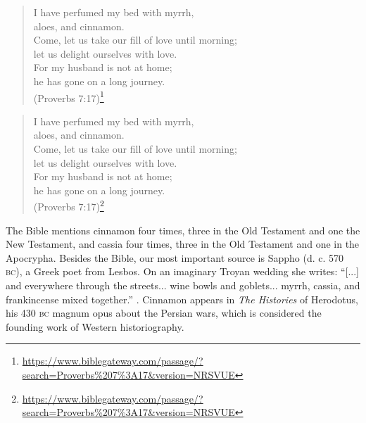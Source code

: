 \begin{quote}
     I have perfumed my bed with myrrh, \\
    aloes, and cinnamon.\\
     Come, let us take our fill of love until morning;\\
    let us delight ourselves with love.\\
     For my husband is not at home;\\
    he has gone on a long journey.\\
    (Proverbs 7:17)\footnote{\url{https://www.biblegateway.com/passage/?search=Proverbs\%207\%3A17&version=NRSVUE}}
\end{quote}

\begin{verse}
     I have perfumed my bed with myrrh, \\
    aloes, and cinnamon.\\
     Come, let us take our fill of love until morning;\\
    let us delight ourselves with love.\\
     For my husband is not at home;\\
    he has gone on a long journey.\\
    (Proverbs 7:17)\footnote{\url{https://www.biblegateway.com/passage/?search=Proverbs\%207\%3A17&version=NRSVUE}}
\end{verse}

The Bible mentions cinnamon four times, three in the Old Testament and one the New Testament, and cassia four times, three in the Old Testament and one in the Apocrypha. Besides the Bible, our most important source is Sappho (d. c. 570 \textsc{bc}), a Greek poet from Lesbos. On an imaginary Troyan wedding she writes: ``[...] and everywhere through the streets... wine bowls and goblets... myrrh, cassia, and frankincense mixed together.'' \autocite[49]{rayor_sappho_2014}. Cinnamon appears in \textit{The Histories} of Herodotus, his 430 \textsc{bc} magnum opus about the Persian wars, which is considered the founding work of Western historiography.

